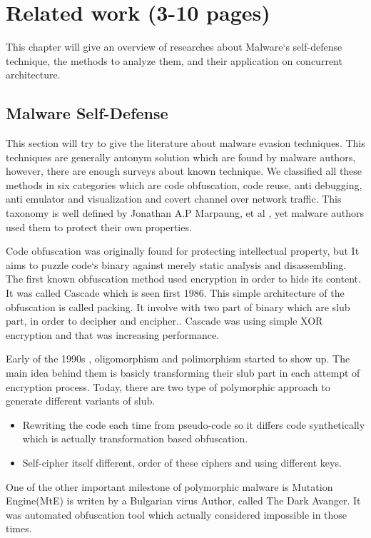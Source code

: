\section{Related work (3-10 pages)}
This chapter will give an overview of researches about Malware`s self-defense technique, the methods to analyze them, and their application on concurrent architecture. 

\subsection{Malware Self-Defense}
This section will try to give the literature about malware evasion techniques. This techniques are generally antonym solution which are found by malware authors, however, there are enough surveys about known technique. We classified all these methods in six categories which are code obfuscation, code reuse, anti debugging, anti emulator and visualization and covert channel over network traffic. This taxonomy is well defined by Jonathan A.P Marpaung, et al \cite{marpaung2012survey}, yet malware authors used them to protect their own properties. 


Code obfuscation was originally  found for protecting intellectual property\cite{balakrishnan2005code}, but It aims to puzzle code`s binary against merely static analysis and disassembling\cite{nachenberg1996understanding}. The first known obfuscation method used encryption in order to hide its content. It was called Cascade which is seen first 1986\cite{you2010malware}. This simple architecture of the obfuscation is called packing\cite{internotsecurityteam}. It involve with two part of binary which are slub part, in order to decipher and encipher.\cite{marpaung2012survey}. Cascade was using simple XOR encryption and that was increasing performance.

Early of the 1990s , oligomorphism and polimorphism started to show up\cite{you2010malware}. The main idea behind them is basicly transforming their slub part in each attempt of encryption process\cite{nachenberg1996understanding}. Today, there are two type of  polymorphic approach to generate different variants of slub.\cite{li2011mechanisms}
\begin{itemize}
  \item Rewriting the code each time from pseudo-code so it differs code synthetically which is actually transformation based obfuscation.
  \item Self-cipher itself different, order of these ciphers and using different keys.
\end{itemize}
One of the other important milestone of polymorphic malware is Mutation Engine(MtE) is writen by a Bulgarian virus Author, called The Dark Avanger. It was automated obfuscation tool which actually considered impossible in those times.\cite{anonymous1}

